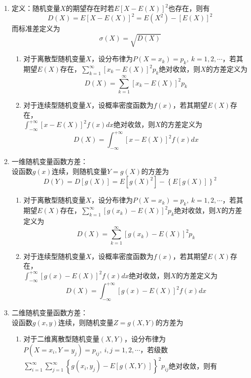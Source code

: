 \documentclass[12pt,a4paper,UTF8]{book}
\begin{document}
\begin{enumerate}
\item 定义：随机变量$X$的期望存在时若$E\left[X-E\left(X\right)\right]^2$也存在，则有
\[D\left(X\right)=E\left[X-E\left(X\right)\right]^2=E\left(X^2\right)-\left[E\left(X\right)\right]^2\]
而标准差定义为
\[\sigma\left(X\right)=\sqrt{D\left(X\right)}\]
\begin{enumerate}
\item 对于离散型随机变量$X$，设分布律为$P\left(X=x_k\right)=p_k,\ k=1,2,\cdots$，若其期望$E\left(X\right)$存在，$\sum\limits_{k=1}^{\infty}\left[x_k-E\left(X\right)\right]^2p_k$绝对收敛，则$X$的方差定义为
\[D\left(X\right)=\sum\limits_{k=1}^{\infty}\left[x_k-E\left(X\right)\right]^2p_k\]
\item 对于连续型随机变量$X$，设概率密度函数为$f\left(x\right)$，若其期望$E\left(X\right)$存在，\\$\int_{-\infty}^{+\infty}\left[x-E\left(X\right)\right]^2f\left(x\right)dx$绝对收敛，则$X$的方差定义为
\[D\left(X\right)=\int_{-\infty}^{+\infty}\left[x-E\left(X\right)\right]^2f\left(x\right)dx\]
\end{enumerate}
\item 一维随机变量函数方差：\\
设函数$g\left(x\right)$连续，则随机变量$Y=g\left(X\right)$的方差为
\[D\left(Y\right)=D\left[g\left(X\right)\right]=E\left[g\left(X\right)^2\right]-\left\{E\left[g\left(X\right)\right]\right\}^2\]
\begin{enumerate}
\item 对于离散型随机变量$X$，设分布律为$P\left(X=x_k\right)=p_k,\ k=1,2,\cdots$，若其期望$E\left(X\right)$存在，$\sum\limits_{k=1}^{\infty}\left[g\left(x_k\right)-E\left(X\right)\right]^2p_k$绝对收敛，则$X$的方差定义为
\[D\left(X\right)=\sum\limits_{k=1}^{\infty}\left[g\left(x_k\right)-E\left(X\right)\right]^2p_k\]
\item 对于连续型随机变量$X$，设概率密度函数为$f\left(x\right)$，若其期望$E\left(X\right)$存在，\\$\int_{-\infty}^{+\infty}\left[g\left(x\right)-E\left(X\right)\right]^2f\left(x\right)dx$绝对收敛，则$X$的方差定义为
\[D\left(X\right)=\int_{-\infty}^{+\infty}\left[g\left(x\right)-E\left(X\right)\right]^2f\left(x\right)dx\]
\end{enumerate}
\item 二维随机变量函数方差：\\
设函数$g\left(x,y\right)$连续，则随机变量$Z=g\left(X,Y\right)$的方差为
\begin{enumerate}
\item 对于二维离散型随机变量$\left(X,Y\right)$，设分布律为$P\left(X=x_i,Y=y_j\right)=p_{ij},\ i,j=1,2,\cdots$，若级数$\sum\limits_{i=1}^{\infty}\sum\limits_{j=1}^{\infty}\left\{g\left(x_i,y_j\right)-E\left[g\left(X,Y\right)\right]\right\}^2p_{ij}$绝对收敛，则有

\end{enumerate}
\end{enumerate}
\end{document}
